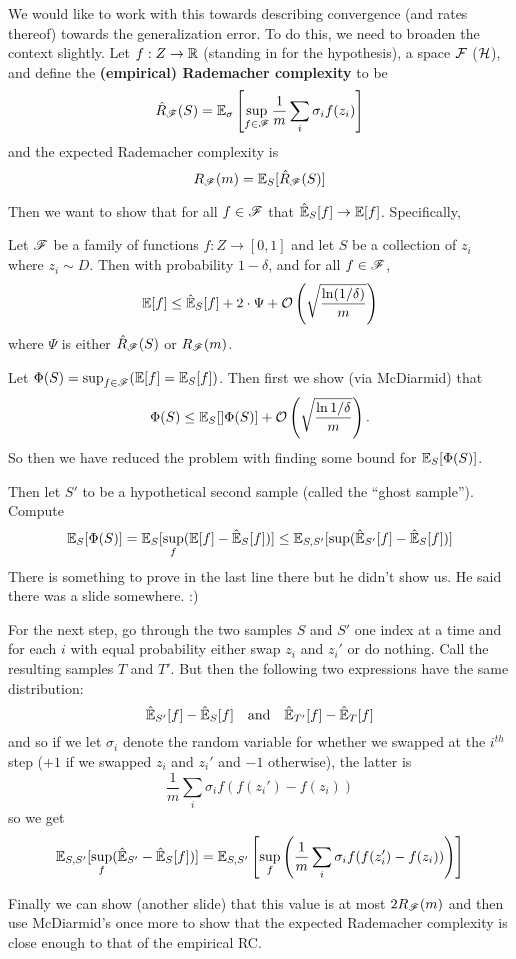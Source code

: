 \documentclass[12pt]{article}
\begin{document}
We would like to work with this towards describing convergence (and rates thereof) towards the generalization error.
To do this, we need to broaden the context slightly. Let $f:Z\to\mathbb{R}$ (standing in for the hypothesis), a space $\mathcal{F}$ ($\mathcal{H}$), and define the \textbf{(empirical) Rademacher complexity} to be 
\[\hat R_{\mathscr{F}}(S)=\mathbb{E}_\sigma\left[\sup_{f\in\mathscr{F}}\frac{1}{m}\sum_i\sigma_if(z_i)\right]\]
and the expected Rademacher complexity is 
\[R_{\mathscr{F}}(m)=\mathbb{E}_S[\hat R_{\mathscr{F}}(S)]\]

Then we want to show that for all $f\in\mathscr{F}$ that $\hat{\mathbb{E}}_S[f]\to\mathbb{E}[f]$. Specifically,
\begin{thm}
	Let $\mathscr{F}$ be a family of functions $f:Z\to[0,1]$ and let $S$ be a collection of $z_i$ where $z_i\sim D$. Then with probability $1-\delta$,
	and for all $f\in\mathscr{F}$,
	\[\mathbb{E}[f]\le\hat{\mathbb{E}}_S[f]+2\cdot\Psi+\mathcal{O}\left(\sqrt{\frac{\ln(1/\delta)}{m}}\right)\]
	where $\Psi$ is either $\hat R_{\mathscr{F}}(S)$ or $R_{\mathscr{F}}(m)$.
\end{thm}
\begin{prf}
	Let $\Phi(S)=\sup_{f\in\mathscr{F}}(\mathbb{E}[f]=\mathbb{E}_S[f])$. Then first we show (via McDiarmid) that 
	\[\Phi(S)\le \mathbb{E}_S[]\Phi(S)]+\mathcal{O}\left(\sqrt{\frac{\ln 1/\delta}{m}}\right).\]
	So then we have reduced the problem with finding some bound for $\mathbb{E}_S[\Phi(S)]$.

	Then let $S'$ to be a hypothetical second sample (called the ``ghost sample''). Compute 
	\[\mathbb{E}_S[\Phi(S)]=\mathbb{E}_S[\sup_f(\mathbb{E}[f]-\hat{\mathbb{E}}_S[f])]\le \mathbb{E}_{S,S'}[\sup(\hat{\mathbb{E}}_{S'}[f]-\hat{\mathbb{E}}_S[f])]\]
	There is something to prove in the last line there but he didn't show us. He said there was a slide somewhere. :)

	For the next step, go through the two samples $S$ and $S'$ one index at a time and for each $i$ with equal probability either swap $z_i$ and $z_i'$ or do nothing.
	Call the resulting samples $T$ and $T'$. But then the following two expressions have the same distribution:
	\[\hat{\mathbb{E}}_{S'}[f]-\hat{\mathbb{E}}_S[f]\quad\text{and}\quad \hat{\mathbb{E}}_{T'}[f]-\hat{\mathbb{E}}_T[f]\]
	and so if we let $\sigma_i$ denote the random variable for whether we swapped at the $i^{th}$ step ($+1$ if we swapped $z_i$ and $z_i'$ and $-1$ otherwise),
	the latter is 
	\[\frac{1}{m}\sum_i\sigma_if(f(z_i')-f(z_i))\]
	so we get 
	\[\mathbb{E}_{S,S'}[\sup_f(\hat{\mathbb{E}}_{S'}-\hat{\mathbb{E}}_S[f])]=\mathbb{E}_{S,S'}\left[\sup_f\left(\frac{1}{m}\sum_i\sigma_if(f(z_i')-f(z_i))\right)\right]\]

	Finally we can show (another slide) that this value is at most $2R_{\mathscr{F}}(m)$ and then use McDiarmid's once more to show that the expected Rademacher complexity is close enough to that of the empirical RC.
\end{prf}
\end{document}
